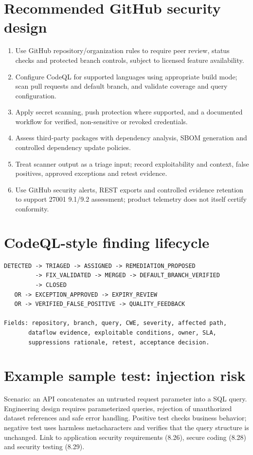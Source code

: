 \documentclass[11pt,letterpaper]{article}
\begin{document}
\section{Recommended GitHub security design}
\begin{enumerate}
\item Use GitHub repository/organization rules to require peer review, status checks and protected branch controls, subject to licensed feature availability.
\item Configure CodeQL for supported languages using appropriate build mode; scan pull requests and default branch, and validate coverage and query configuration.
\item Apply secret scanning, push protection where supported, and a documented workflow for verified, non-sensitive or revoked credentials.
\item Assess third-party packages with dependency analysis, SBOM generation and controlled dependency update policies.
\item Treat scanner output as a triage input; record exploitability and context, false positives, approved exceptions and retest evidence.
\item Use GitHub security alerts, REST exports and controlled evidence retention to support 27001 9.1/9.2 assessment; product telemetry does not itself certify conformity.
\end{enumerate}

\section{CodeQL-style finding lifecycle}
\begin{verbatim}
DETECTED -> TRIAGED -> ASSIGNED -> REMEDIATION_PROPOSED
         -> FIX_VALIDATED -> MERGED -> DEFAULT_BRANCH_VERIFIED
         -> CLOSED
   OR -> EXCEPTION_APPROVED -> EXPIRY_REVIEW
   OR -> VERIFIED_FALSE_POSITIVE -> QUALITY_FEEDBACK

Fields: repository, branch, query, CWE, severity, affected path,
       dataflow evidence, exploitable conditions, owner, SLA,
       suppressions rationale, retest, acceptance decision.
\end{verbatim}
\section{Example sample test: injection risk}
Scenario: an API concatenates an untrusted request parameter into a SQL query. Engineering design requires parameterized queries, rejection of unauthorized dataset references and safe error handling. Positive test checks business behavior; negative test uses harmless metacharacters and verifies that the query structure is unchanged. Link to application security requirements (8.26), secure coding (8.28) and security testing (8.29).
\end{document}
